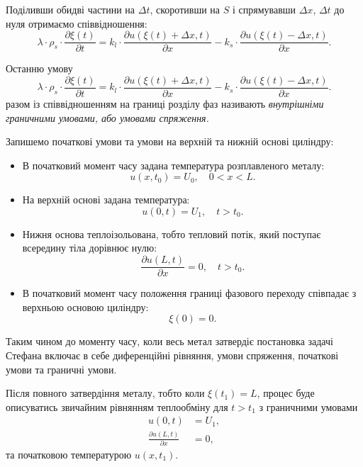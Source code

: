 Поділивши обидві частини на $\Delta t$, скоротивши на $S$ і спрямувавши $\Delta x$, $\Delta t$ до нуля отримаємо співвідношення:
\begin{equation}
	\lambda \cdot \rho_s \cdot \frac{\partial \xi(t)}{\partial t} = k_l \cdot \frac{\partial u(\xi(t) + \Delta x, t)}{\partial x} - k_s \cdot \frac{\partial u(\xi(t) - \Delta x, t)}{\partial x}.
\end{equation}

\begin{definition}
	Останню умову 
	\begin{equation}
		\lambda \cdot \rho_s \cdot \frac{\partial \xi(t)}{\partial t} = k_l \cdot \frac{\partial u(\xi(t) + \Delta x, t)}{\partial x} - k_s \cdot \frac{\partial u(\xi(t) - \Delta x, t)}{\partial x}.
	\end{equation}
	разом із співвідношенням на границі розділу фаз називають \it{внутрішніми граничними умовами}, або \it{умовами спряження}.
\end{definition}

Запишемо початкові умови та умови на верхній та нижній основі циліндру:
\begin{itemize}
	\item В початковий момент часу задана температура розплавленого металу:
	\begin{equation}
		u(x, t_0) = U_0, \quad 0 < x < L.
	\end{equation}
	
	\item На верхній основі задана температура:
	\begin{equation}
		u(0, t) = U_1, \quad t > t_0.
	\end{equation}

	\item Нижня основа теплоізольована, тобто тепловий потік, який поступає всередину тіла дорівнює нулю:
	\begin{equation}
		\frac{\partial u(L, t)}{\partial x} = 0, \quad t > t_0.
	\end{equation}
	
	\item В початковий момент часу положення границі фазового переходу співпадає з верхньою основою циліндру: 
	\begin{equation}
		\xi(0) = 0.
	\end{equation}
\end{itemize}

Таким чином до моменту часу, коли весь метал затвердіє постановка задачі Стефана включає в себе диференційні рівняння, умови спряження, початкові умови та граничні умови. \medskip

\begin{remark}
	Після повного затвердіння металу, тобто коли $\xi(t_1) = L$, процес буде описуватись звичайним рівнянням теплообміну для $t > t_1$ з граничними умовами
	\begin{align}
		u(0, t) &= U_1, \\
		\frac{\partial u(L, t)}{\partial x} &= 0,
	\end{align}
	та початковою температурою $u(x, t_1)$.
\end{remark}

% 
